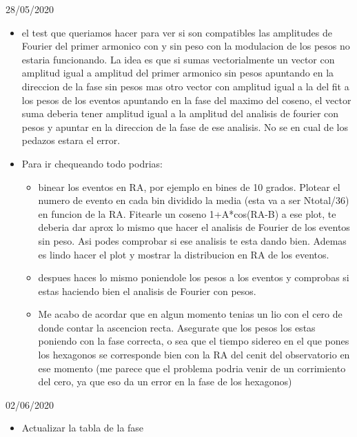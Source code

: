 28/05/2020

\begin{itemize}
	\done llama la atencion la modulacion de los hexagonos y de los pesos que pones en la tabla 1.3. Deberian tener aprox la misma amplitud y fase opuesta. Creo que estan mal los valores del fit a los hexagonos, deberia ser a ojo una amplitud cerca a 0.0035 y una fase cerca de 100. Igual es raro porque las curvas en el plot tienen pinta razonable. Fijate que cuando fiteas un coseno 1+A*cos(RA-B) va con menos B, asi B es la fase donde la funcion tiene el maximo. Fijate que si fiteas a una funcion con media distinta de 1, la amplitud es el factor A en C*(1+A*cos(RA-B)) y  no el factor  A en C+A*cos(RA-B)

	\item  el test que queriamos hacer para ver si son compatibles las amplitudes de Fourier del primer armonico con y sin peso con la modulacion de los pesos no estaria funcionando. La idea es que si sumas vectorialmente un vector con amplitud igual a amplitud del primer armonico sin pesos apuntando en la direccion de la fase sin pesos mas otro vector con amplitud igual a la del fit a los pesos de los eventos apuntando en la fase del maximo del coseno, el vector suma deberia tener amplitud igual a la amplitud del analisis de fourier con pesos y apuntar en la direccion de la fase de ese analisis. No se en cual de los pedazos estara el error.
	
	\item Para ir chequeando todo podrias:
	\begin{itemize}
	
		\item  binear los eventos en RA, por ejemplo en bines de 10 grados. Plotear el numero de evento en cada bin dividido la media (esta va a ser Ntotal/36) en funcion de la RA. Fitearle un coseno 1+A*cos(RA-B) a ese plot, te deberia dar aprox lo mismo que hacer el analisis de Fourier de los eventos sin peso. Asi podes comprobar si ese analisis te esta dando bien. Ademas es lindo hacer el plot y mostrar la distribucion en RA de los eventos.
	
		\item  despues haces lo mismo poniendole los pesos a los eventos y comprobas si estas haciendo bien el analisis de Fourier con pesos.
	
		\item  Me acabo de acordar que en algun momento tenias un lio con el  cero de donde contar la ascencion recta. Asegurate que los pesos los estas poniendo con la fase correcta, o sea que el tiempo sidereo en el que pones los hexagonos se corresponde bien con la RA del cenit del observatorio en ese momento (me parece que el problema podria venir de un 	corrimiento del cero, ya que eso da un error en la fase de los hexagonos)
	\end{itemize}

\end{itemize}


02/06/2020

\begin{itemize}
	\item Actualizar la tabla de la fase
\end{itemize}